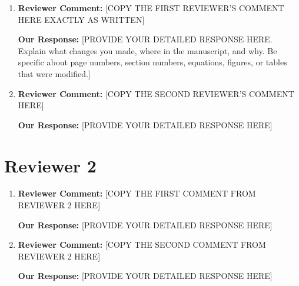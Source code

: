 \documentclass[12pt]{article}
\begin{document}
\begin{enumerate}

\item \textbf{Reviewer Comment:} [COPY THE FIRST REVIEWER'S COMMENT HERE EXACTLY AS WRITTEN]

\textbf{Our Response:} {\color{red}[PROVIDE YOUR DETAILED RESPONSE HERE. Explain what changes you made, where in the manuscript, and why. Be specific about page numbers, section numbers, equations, figures, or tables that were modified.]}

\item \textbf{Reviewer Comment:} [COPY THE SECOND REVIEWER'S COMMENT HERE]

\textbf{Our Response:} {\color{red}[PROVIDE YOUR DETAILED RESPONSE HERE]}


\end{enumerate}


\section*{Reviewer 2}

\begin{enumerate}

\item \textbf{Reviewer Comment:} [COPY THE FIRST COMMENT FROM REVIEWER 2 HERE]

\textbf{Our Response:} {\color{red}[PROVIDE YOUR DETAILED RESPONSE HERE]}

\item \textbf{Reviewer Comment:} [COPY THE SECOND COMMENT FROM REVIEWER 2 HERE]

\textbf{Our Response:} {\color{red}[PROVIDE YOUR DETAILED RESPONSE HERE]}


\end{enumerate}
\end{document}
